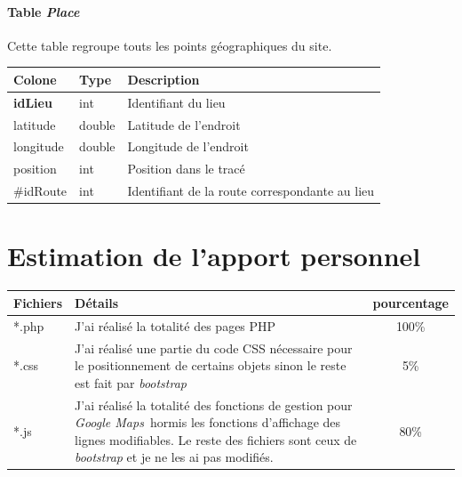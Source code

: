 \documentclass[a4paper]{article}
\newcommand{\gmap}{\emph{Google Maps}}
\begin{document}
\paragraph{Table \emph{Place}}
Cette table regroupe touts les points géographiques du site.

\begin{tabular}{|l|l|l|}
	\hline
	Colone          & Type   & Description                                    \\ \hline\hline
	\textbf{idLieu} & int    & Identifiant du lieu                            \\ \hline
	latitude        & double & Latitude de l'endroit                          \\ \hline
	longitude       & double & Longitude de l'endroit                         \\ \hline
	position        & int    & Position dans le tracé                         \\ \hline
	\#idRoute       & int    & Identifiant de la route correspondante au lieu \\ \hline
\end{tabular}
\pagebreak



\section{Estimation de l'apport personnel}
\begin{tabular}{|l|p{11cm}|c|}
	\hline
	Fichiers & Détails                                                                                                                                                                                                & pourcentage \\ \hline\hline
	*.php    & J'ai réalisé la totalité des pages PHP                                                                                                                                                                 &    100\%    \\ \hline
	*.css    & J'ai réalisé une partie du code CSS nécessaire pour le positionnement de certains objets sinon le reste est fait par \emph{bootstrap}                                                                    &     5\%     \\ \hline
	*.js     & J'ai réalisé la totalité des fonctions de gestion pour \gmap \ hormis les fonctions d'affichage des lignes modifiables. Le reste des fichiers sont ceux de \emph{bootstrap} et je ne les ai pas modifiés. &    80\%     \\ \hline
\end{tabular}
\end{document}
